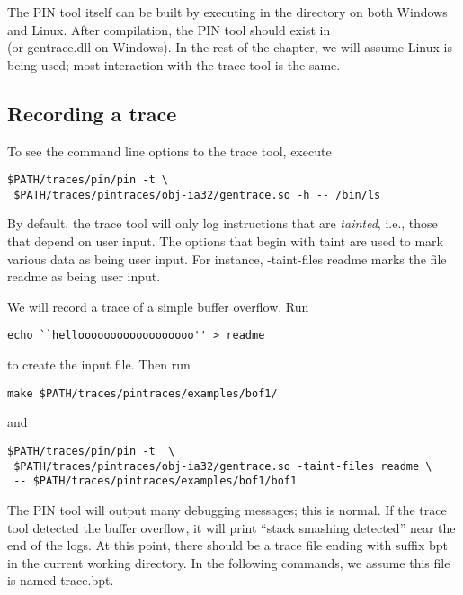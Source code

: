 The PIN tool itself can be built by executing  in the
 directory on both Windows and Linux.
After compilation, the PIN tool should exist in
\\  (or
gentrace.dll on Windows).  In the rest of the chapter, we will assume
Linux is being used; most interaction with the trace tool is the same.

\subsection{Recording a trace}

To see the command line options to the trace tool, execute 

\begin{verbatim} 
$PATH/traces/pin/pin -t \
 $PATH/traces/pintraces/obj-ia32/gentrace.so -h -- /bin/ls
\end{verbatim}

By default, the trace tool will only log instructions that are
\emph{tainted}, i.e., those that depend on user input.  The options
that begin with taint are used to mark various data
as being user input.  For instance, -taint-files readme marks the file
readme as being user input.

We will record a trace of a simple buffer overflow.  Run 

\begin{verbatim}
echo ``helloooooooooooooooooo'' > readme
\end{verbatim}

 to create the input file.  Then run 

\begin{verbatim}
make $PATH/traces/pintraces/examples/bof1/
\end{verbatim}

and

\begin{verbatim}
$PATH/traces/pin/pin -t  \
 $PATH/traces/pintraces/obj-ia32/gentrace.so -taint-files readme \
 -- $PATH/traces/pintraces/examples/bof1/bof1
\end{verbatim}

The PIN tool will output
many debugging messages; this is normal.  If the trace tool detected
the buffer overflow, it will print ``stack smashing detected'' near
the end of the logs.  At this point, there should be a trace file
ending with suffix bpt in the current working directory.  In the
following commands, we assume this file is named trace.bpt.

